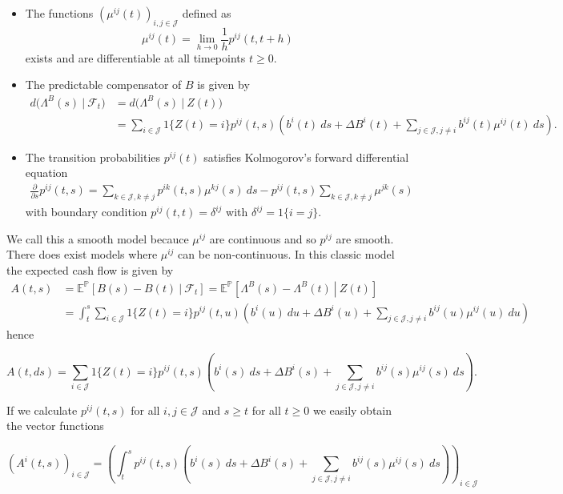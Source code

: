 \documentclass[a4paper,10pt,openany]{book}
\providecommand{\tightlist}{%
 \setlength{\itemsep}{0pt}\setlength{\parskip}{0pt}}
\begin{document}
\begin{itemize}
\tightlist
\item
  The functions \((\mu^{ij}(t))_{i,j\in\mathcal J}\) defined as
  \[\mu^{ij}(t)=\lim_{h\to 0}\frac{1}{h}p^{ij}(t,t+h)\]
  exists and are differentiable at all timepoints \(t\ge 0\).
\item
  The predictable compensator of \(B\) is given by
  \begin{align*}
    d\Big(\Lambda^B(s)\ \vert\ \mathcal F_t\Big)&=d\Big(\Lambda^B(s)\ \vert\ Z(t)\Big)\\
    &=\sum_{i\in \mathcal J}1\{Z(t)=i\}p^{ij}(t,s)\left(b^i(t)\ ds+\Delta B^i(t)+\sum_{j\in\mathcal J, j\ne i}b^{ij}(t)\mu^{ij}(t)\ ds\right).
    \end{align*}
\item
  The transition probabilities \(p^{ij}(t)\) satisfies Kolmogorov's forward differential equation
  \begin{align*}
    \frac{\partial}{\partial s}p^{ij}(t,s)=\sum_{k\in\mathcal J,k\ne j}p^{ik}(t,s)\mu^{kj}(s)\ ds-p^{ij}(t,s)\sum_{k\in\mathcal J, k\ne j}\mu^{jk}(s)
    \end{align*}
  with boundary condition \(p^{ij}(t,t)=\delta^{ij}\) with \(\delta^{ij}=1\{i=j\}\).
\end{itemize}

We call this a smooth model becauce \(\mu^{ij}\) are continuous and so \(p^{ij}\) are smooth. There does exist models where \(\mu^{ij}\) can be non-continuous. In this classic model the expected cash flow is given by
\begin{align*}
A(t,s)&=\mathbb E^\mathbb P\left[\left.B(s)-B(t)\ \right\vert\ \mathcal F_t\right]=\mathbb E^\mathbb P\left[\left.\Lambda^B(s)-\Lambda^B(t)\ \right\vert\  Z(t)\right]\\
&=\int_t^s\sum_{i\in \mathcal J}1\{Z(t)=i\}p^{ij}(t,u)\left(b^i(u)\ du+\Delta B^i(u)+\sum_{j\in\mathcal J, j\ne i}b^{ij}(u)\mu^{ij}(u)\ du\right)
\end{align*}
hence

\[
A(t,ds)=\sum_{i\in \mathcal J}1\{Z(t)=i\}p^{ij}(t,s)\left(b^i(s)\ ds+\Delta B^i(s)+\sum_{j\in\mathcal J, j\ne i}b^{ij}(s)\mu^{ij}(s)\ ds\right).
\]

If we calculate \(p^{ij}(t,s)\) for all \(i,j\in\mathcal J\) and \(s\ge t\) for all \(t\ge 0\) we easily obtain the vector functions

\[
\left(A^i(t,s)\right)_{i\in\mathcal J}=\left(\int_t^s p^{ij}(t,s)\left(b^i(s)\ ds+\Delta B^i(s)+\sum_{j\in\mathcal J, j\ne i}b^{ij}(s)\mu^{ij}(s)\ ds\right)\right)_{i\in\mathcal J}
\]
\end{document}
